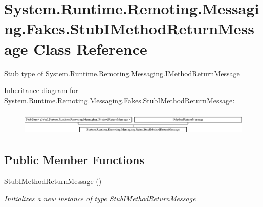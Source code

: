 \hypertarget{class_system_1_1_runtime_1_1_remoting_1_1_messaging_1_1_fakes_1_1_stub_i_method_return_message}{\section{System.\-Runtime.\-Remoting.\-Messaging.\-Fakes.\-Stub\-I\-Method\-Return\-Message Class Reference}
\label{class_system_1_1_runtime_1_1_remoting_1_1_messaging_1_1_fakes_1_1_stub_i_method_return_message}
}


Stub type of System.\-Runtime.\-Remoting.\-Messaging.\-I\-Method\-Return\-Message 


Inheritance diagram for System.\-Runtime.\-Remoting.\-Messaging.\-Fakes.\-Stub\-I\-Method\-Return\-Message\-:\begin{figure}[H]
\begin{center}
\leavevmode
\includegraphics[height=1.166667cm]{class_system_1_1_runtime_1_1_remoting_1_1_messaging_1_1_fakes_1_1_stub_i_method_return_message}
\end{center}
\end{figure}
\subsection*{Public Member Functions}
\begin{DoxyCompactItemize}
\item 
\hyperlink{class_system_1_1_runtime_1_1_remoting_1_1_messaging_1_1_fakes_1_1_stub_i_method_return_message_a42fe1e70e39b2394bc934076d9524dd2}{Stub\-I\-Method\-Return\-Message} ()
\begin{DoxyCompactList}\small\item\em Initializes a new instance of type \hyperlink{class_system_1_1_runtime_1_1_remoting_1_1_messaging_1_1_fakes_1_1_stub_i_method_return_message}{Stub\-I\-Method\-Return\-Message}\end{DoxyCompactList}\end{DoxyCompactItemize}
